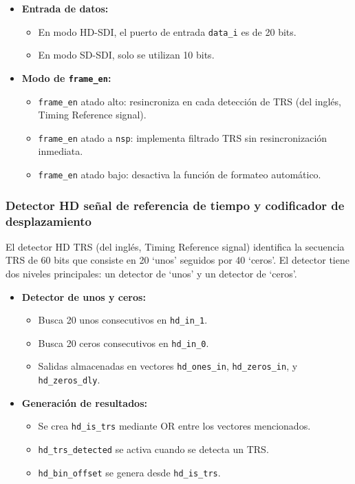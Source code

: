 \begin{itemize}
    \item \textbf{Entrada de datos:}
    \begin{itemize}
        \item En modo HD-SDI, el puerto de entrada \texttt{data\_i} es de 20 bits.
        \item En modo SD-SDI, solo se utilizan 10 bits.
    \end{itemize}
    
    \item \textbf{Modo de \texttt{frame\_en}:}
    \begin{itemize}
        \item \texttt{frame\_en} atado alto: resincroniza en cada detección de TRS  (del inglés, Timing Reference signal).
        \item \texttt{frame\_en} atado a \texttt{nsp}: implementa filtrado TRS sin resincronización inmediata.
        \item \texttt{frame\_en} atado bajo: desactiva la función de formateo automático.
    \end{itemize}
\end{itemize}

\subsubsection{Detector HD señal de referencia de tiempo y codificador de desplazamiento}

El detector HD TRS (del inglés, Timing Reference signal) identifica la secuencia
TRS de 60 bits que consiste en 20 `unos' seguidos por 40 `ceros'. El detector tiene
dos niveles principales: un detector de `unos' y un detector de `ceros'.

\begin{itemize}
    \item \textbf{Detector de unos y ceros:}
    \begin{itemize}
        \item Busca 20 unos consecutivos en \texttt{hd\_in\_1}.
        \item Busca 20 ceros consecutivos en \texttt{hd\_in\_0}.
        \item Salidas almacenadas en vectores \texttt{hd\_ones\_in}, \texttt{hd\_zeros\_in}, y \texttt{hd\_zeros\_dly}.
    \end{itemize}
    
    \item \textbf{Generación de resultados:}
    \begin{itemize}
        \item Se crea \texttt{hd\_is\_trs} mediante OR entre los vectores mencionados.
        \item \texttt{hd\_trs\_detected} se activa cuando se detecta un TRS.
        \item \texttt{hd\_bin\_offset} se genera desde \texttt{hd\_is\_trs}.
    \end{itemize}
\end{itemize}

